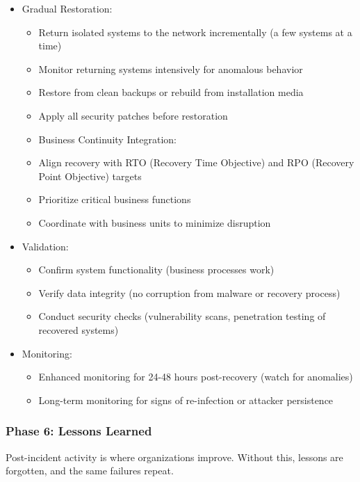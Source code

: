 \documentclass[10pt]{article}
\begin{document}
\begin{itemize}
  \item Gradual Restoration:
  \begin{itemize}
  	\item Return isolated systems to the network incrementally (a few systems at a time)
  	\item Monitor returning systems intensively for anomalous behavior
  	\item Restore from clean backups or rebuild from installation media
  	\item Apply all security patches before restoration
  	\item Business Continuity Integration:
  	\item Align recovery with RTO (Recovery Time Objective) and RPO (Recovery Point Objective) targets
  	\item Prioritize critical business functions
  	\item Coordinate with business units to minimize disruption
  \end{itemize}
  \item Validation:
  \begin{itemize}
  	\item Confirm system functionality (business processes work)
  	\item Verify data integrity (no corruption from malware or recovery process)
  	\item Conduct security checks (vulnerability scans, penetration testing of recovered systems)
  \end{itemize}
  \item Monitoring:
  \begin{itemize}
  	\item Enhanced monitoring for 24-48 hours post-recovery (watch for anomalies)
  	\item Long-term monitoring for signs of re-infection or attacker persistence
  \end{itemize}
\end{itemize}

\subsubsection*{Phase 6: Lessons Learned}
Post-incident activity is where organizations improve. Without this, lessons are forgotten, and the same failures repeat.
\end{document}
